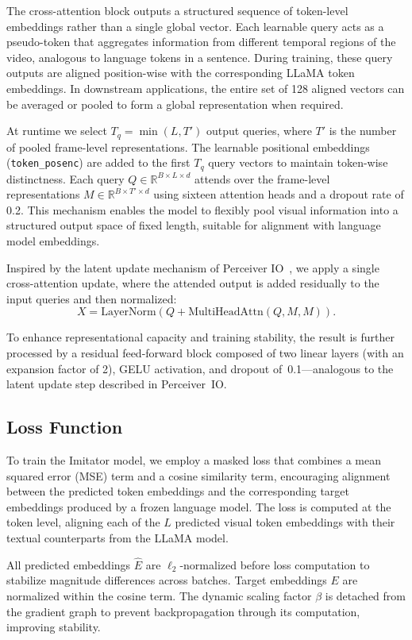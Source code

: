 \documentclass[runningheads]{llncs}
\begin{document}
The cross-attention block outputs a structured sequence of token-level embeddings rather than a single global vector. Each learnable query acts as a pseudo-token that aggregates information from different temporal regions of the video, analogous to language tokens in a sentence. During training, these query outputs are aligned position-wise with the corresponding LLaMA token embeddings. In downstream applications, the entire set of 128 aligned vectors can be averaged or pooled to form a global representation when required.


At runtime we select $T_q = \min(L, T')$ output queries, where $T'$ is the number of pooled frame-level representations. The learnable positional embeddings (\texttt{token\_posenc}) are added to the first $T_q$ query vectors to maintain token-wise distinctness. Each query $Q \in \mathbb{R}^{B \times L \times d}$ attends over the frame-level representations $M \in \mathbb{R}^{B \times T' \times d}$ using sixteen attention heads and a dropout rate of 0.2. This mechanism enables the model to flexibly pool visual information into a structured output space of fixed length, suitable for alignment with language model embeddings.

Inspired by the latent update mechanism of Perceiver IO~\cite{jaegle2021perceiver}, we apply a single cross-attention update, where the attended output is added residually to the input queries and then normalized:
\[
    X = \mathrm{LayerNorm}(Q + \mathrm{MultiHeadAttn}(Q, M, M)).
\]

To enhance representational capacity and training stability, the result is further processed 
by a residual feed-forward block composed of two linear layers (with an expansion factor of 2), 
GELU activation, and dropout of~0.1---analogous to the latent update step described 
in Perceiver~IO.

\subsection{Loss Function}

To train the Imitator model, we employ a masked loss that combines a mean squared error (MSE) term and a cosine similarity term, encouraging alignment between the predicted token embeddings and the corresponding target embeddings produced by a frozen language model. The loss is computed at the token level, aligning each of the $L$ predicted visual token embeddings with their textual counterparts from the LLaMA model. 

All predicted embeddings $\hat{E}$ are $\ell_2$-normalized before loss computation to stabilize magnitude differences across batches. Target embeddings $E$ are normalized within the cosine term. The dynamic scaling factor $\beta$ is detached from the gradient graph to prevent backpropagation through its computation, improving stability.
\end{document}
